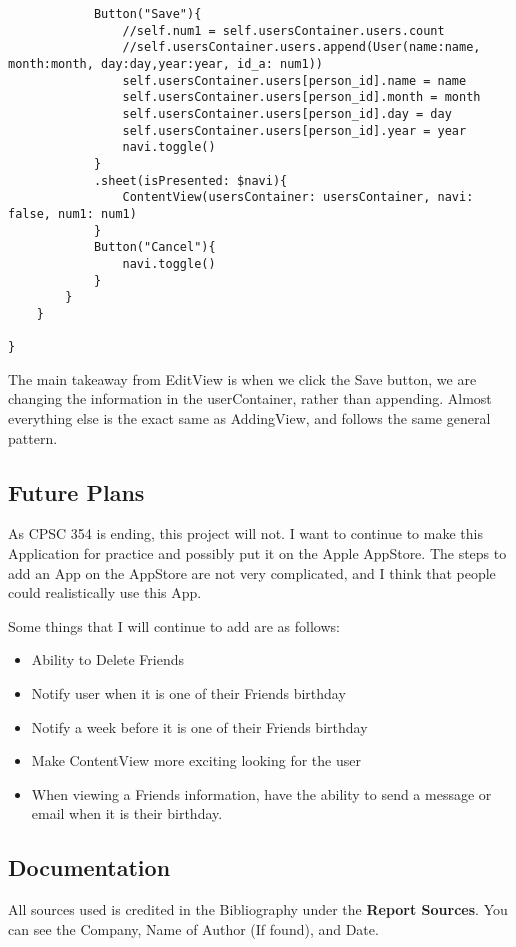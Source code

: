 \documentclass{article}
\theoremstyle{theorem}
\theoremstyle{definition}
\theoremstyle{remark}
\begin{document}
\begin{verbatim}
            Button("Save"){
                //self.num1 = self.usersContainer.users.count
                //self.usersContainer.users.append(User(name:name, month:month, day:day,year:year, id_a: num1))
                self.usersContainer.users[person_id].name = name
                self.usersContainer.users[person_id].month = month
                self.usersContainer.users[person_id].day = day
                self.usersContainer.users[person_id].year = year
                navi.toggle()
            }
            .sheet(isPresented: $navi){
                ContentView(usersContainer: usersContainer, navi: false, num1: num1)
            }
            Button("Cancel"){
                navi.toggle()
            }
        }
    }
    
}

\end{verbatim}

The main takeaway from EditView is when we click the Save button, we are changing the information in the userContainer, rather than appending. Almost everything else is the exact same as AddingView, and follows the same general pattern.

\subsection{Future Plans}
As CPSC 354 is ending, this project will not. I want to continue to make this Application for practice and possibly put it on the Apple AppStore. The steps to add an App on the AppStore are not very complicated, and I think that people could realistically use this App. 

\noindent\newline Some things that I will continue to add are as follows:
\begin{itemize}
  \item Ability to Delete Friends
  \item Notify user when it is one of their Friends birthday
  \item Notify a week before it is one of their Friends birthday
  \item Make ContentView more exciting looking for the user
  \item When viewing a Friends information, have the ability to send a message or email when it is their birthday.
\end{itemize}

\subsection{Documentation}
All sources used is credited in the Bibliography under the \textbf{Report Sources}. You can see the Company, Name of Author (If found), and Date.
\end{document}
